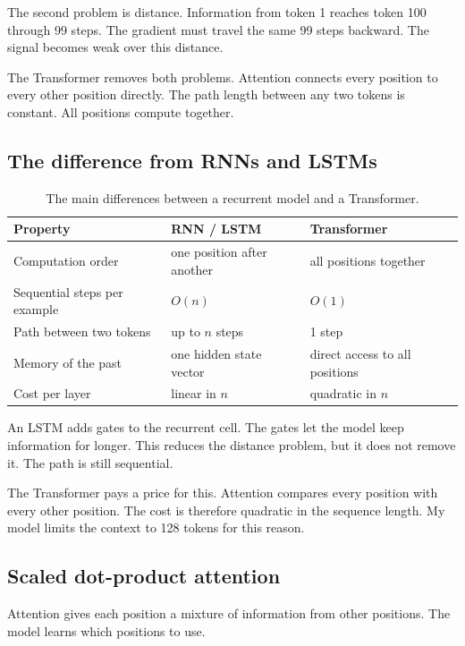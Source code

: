 \documentclass[11pt,a4paper]{article}
\begin{document}
The second problem is distance. Information from token 1 reaches token 100 through 99 steps. The
gradient must travel the same 99 steps backward. The signal becomes weak over this distance.

The Transformer removes both problems. Attention connects every position to every other position
directly. The path length between any two tokens is constant. All positions compute together.

\subsection{The difference from RNNs and LSTMs}

\begin{table}[htbp]\centering
\begin{tabular}{@{}lll@{}}
\toprule
\textbf{Property} & \textbf{RNN / LSTM} & \textbf{Transformer} \\
\midrule
Computation order & one position after another & all positions together \\
Sequential steps per example & $O(n)$ & $O(1)$ \\
Path between two tokens & up to $n$ steps & 1 step \\
Memory of the past & one hidden state vector & direct access to all positions \\
Cost per layer & linear in $n$ & quadratic in $n$ \\
\bottomrule
\end{tabular}
\caption{The main differences between a recurrent model and a Transformer.}
\end{table}

An LSTM adds gates to the recurrent cell. The gates let the model keep information for longer.
This reduces the distance problem, but it does not remove it. The path is still sequential.

The Transformer pays a price for this. Attention compares every position with every other
position. The cost is therefore quadratic in the sequence length. My model limits the context to
128 tokens for this reason.

\subsection{Scaled dot-product attention}

Attention gives each position a mixture of information from other positions. The model learns
which positions to use.
\end{document}
